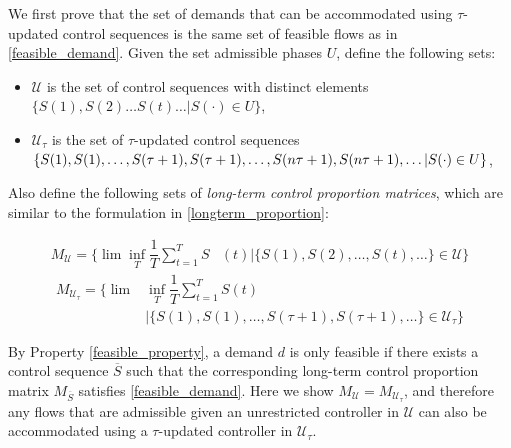 We first prove that the set of demands that can be accommodated using $\tau$-updated control sequences is the same set of feasible flows as in \eqref{feasible_demand}. 
Given the set admissible phases $U$, define the following sets:
\begin{itemize}
\item $\mathcal U$ is the set of control sequences with distinct elements $\{S(1), S(2) \ldots S(t) \ldots |  S(\cdot) \in U\} $,
\item $\mathcal U_{\tau}$ is the set of $\tau$-updated control sequences $\{S(1), S(1), \ldots ,  S(\tau + 1),S(\tau + 1), \ldots , S(n\tau + 1), \\  S(n\tau + 1), \ldots |  S(\cdot) \in U\} $, 
\end{itemize}
Also define the following sets of \emph{long-term control proportion matrices}, which are similar to the formulation in \eqref{longterm_proportion}:
\vspace{-.5em}
\begin{small}
\begin{align*} M_{\mathcal U} = \Big\{\lim \inf_{T}\dfrac{1}{T}\sum_{t=1}^{T}  S&(t)  \Big| \{S(1), S(2), \ldots, S(t), \ldots \}\in \mathcal U \Big\} \end{align*}
\vspace{-1em}
\begin{align*} M_{\mathcal U_\tau} = \Big\{\lim&\inf_{T} \dfrac{1}{T}\sum_{t=1}^{T} S(t) \\ & \Big| \{S(1), S(1), \ldots,  S(\tau+1),S(\tau+1), \ldots\}\in \mathcal U_{\tau} \Big\} \end{align*}
\end{small}
\vspace{-1em}

By Property \ref{feasible_property}, a demand $d$ is only feasible if there exists a control sequence $\overline {S}$ such that the corresponding long-term control proportion matrix $M_{\overline {S}}$ satisfies \eqref{feasible_demand}. Here we show $M_{\mathcal U} = M_{\mathcal{U_\tau}}$, and therefore any flows that are admissible given an unrestricted controller in $\mathcal U$ can also be accommodated using a $\tau$-updated controller in $\mathcal{U}_\tau$. 

